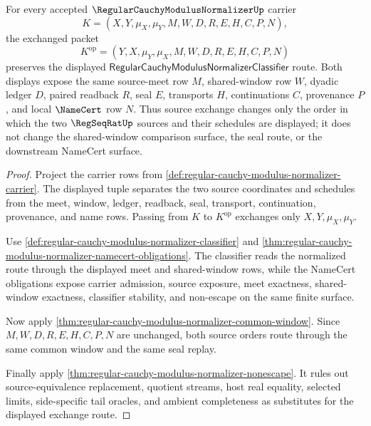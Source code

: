 \begin{theorem}
\label{thm:regular-cauchy-modulus-normalizer-source-exchange-stability}
For every accepted $\RegularCauchyModulusNormalizerUp$ carrier
$$
K=(X,Y,\mu_X,\mu_Y,M,W,D,R,E,H,C,P,N),
$$
the exchanged packet
$$
K^{\mathrm{op}}=(Y,X,\mu_Y,\mu_X,M,W,D,R,E,H,C,P,N)
$$
preserves the displayed $\mathsf{RegularCauchyModulusNormalizerClassifier}$
route. Both displays expose the same source-meet row $M$, shared-window row
$W$, dyadic ledger $D$, paired readback $R$, seal $E$, transports $H$,
continuations $C$, provenance $P$, and local $\NameCert$ row $N$. Thus source
exchange changes only the order in which the two $\RegSeqRatUp$ sources and
their schedules are displayed; it does not change the shared-window comparison
surface, the seal route, or the downstream NameCert surface.
\end{theorem}
\begin{proof}
Project the carrier rows from \autoref{def:regular-cauchy-modulus-normalizer-carrier}.
The displayed tuple separates the two source coordinates and schedules from the
meet, window, ledger, readback, seal, transport, continuation, provenance, and
name rows. Passing from $K$ to $K^{\mathrm{op}}$ exchanges only
$X,Y,\mu_X,\mu_Y$.

Use \autoref{def:regular-cauchy-modulus-normalizer-classifier} and
\autoref{thm:regular-cauchy-modulus-normalizer-namecert-obligations}. The
classifier reads the normalized route through the displayed meet and
shared-window rows, while the NameCert obligations expose carrier admission,
source exposure, meet exactness, shared-window exactness, classifier stability,
and non-escape on the same finite surface.

Now apply \autoref{thm:regular-cauchy-modulus-normalizer-common-window}. Since
$M,W,D,R,E,H,C,P,N$ are unchanged, both source orders route through the same
common window and the same seal replay.

Finally apply \autoref{thm:regular-cauchy-modulus-normalizer-nonescape}. It
rules out source-equivalence replacement, quotient streams, host real equality,
selected limits, side-specific tail oracles, and ambient completeness as
substitutes for the displayed exchange route.
\end{proof}

